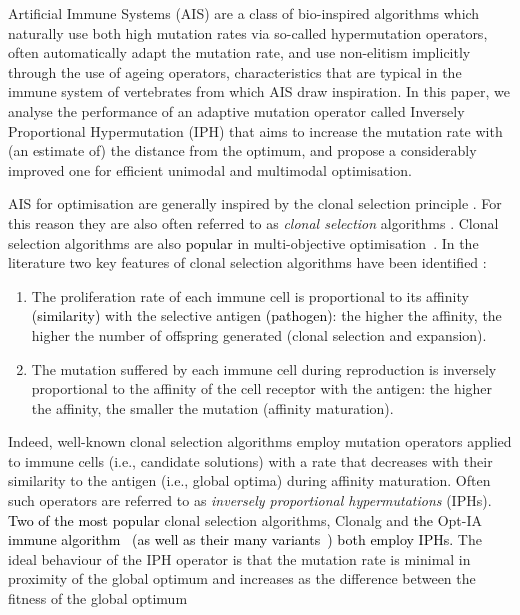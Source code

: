 \documentclass[lettersize,journal]{IEEEtran}
\newcommand{\new}[1]{\textcolor{black}{#1}}
\newcommand{\rev}[1]{\textcolor{black}{#1}}
\begin{document}
Artificial Immune Systems (AIS) are a class of bio-inspired algorithms which naturally use both high mutation rates via so-called hypermutation operators, often automatically adapt the mutation rate,  and use non-elitism implicitly through the use of ageing operators, characteristics that are typical in the immune system of vertebrates from which AIS draw inspiration. In this paper, we analyse the performance of an adaptive mutation operator called Inversely Proportional Hypermutation (IPH) that aims to increase the mutation rate with (an estimate of) the distance from the optimum, and propose a considerably improved one for efficient unimodal and multimodal optimisation.

AIS for optimisation \cite{DeCastroTimmisBook,MO2020AAAI} are generally inspired by the clonal selection principle  \cite{Burnet1959}.
For this reason they are also often referred  to as {\it clonal selection} algorithms \cite{DeCastroTimmisBook}. 
Clonal selection algorithms are also \rev{popular} in 
multi-objective optimisation~\cite{CoelloEMO2025,Coello2022,COY25,HuangZhou2020,EMOReview}. 
In the literature two key features of clonal selection algorithms have been identified \cite{Brownlee2007}: 
\begin{enumerate}
	\item  The proliferation rate of each immune cell is proportional to its affinity \new{(similarity)} with the selective antigen \new{(pathogen)}: the higher the affinity, 
	the higher the number of offspring generated (clonal selection and expansion). \item The mutation suffered by each immune cell during reproduction is inversely proportional to the affinity of the cell receptor with the antigen: the higher the affinity, 
	the smaller the mutation (affinity maturation).
\end{enumerate}
Indeed, well-known clonal selection algorithms employ mutation operators applied to immune cells (i.e., candidate solutions) with a rate that decreases with their similarity to the 
antigen (i.e., global optima) during affinity maturation. Often such operators are referred to as {\it inversely proportional hypermutations} (IPHs). 
\new{Two of the most popular} clonal selection algorithms, Clonalg \cite{DecastroVonzuben2002}   and \new{the} Opt-IA \new{immune algorithm~\cite{CutelloNicosiaPavoneTimmis2007} (as well as their many variants~\cite{ClonalSelectionReview}) both employ IPHs. } %
The ideal behaviour of the IPH operator is that the mutation rate is minimal in proximity of the global optimum and increases as the difference between the fitness of the global optimum
\end{document}
